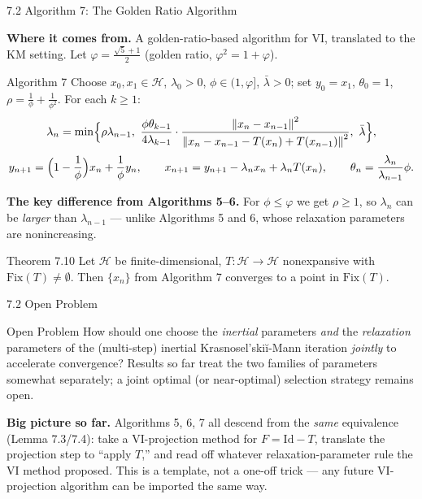 \documentclass[aspectratio=169,10pt]{beamer}
\newcommand{\mHH}{\mathcal H}
\newcommand{\norm}[1]{\left\|#1\right\|}
\newcommand{\Fix}{\mathrm{Fix}}
\newcommand{\Id}{\mathrm{Id}}
\begin{document}
\begin{frame}{7.2 Algorithm 7: The Golden Ratio Algorithm}

  \textbf{Where it comes from.} A golden-ratio-based algorithm for
  VI, translated to the KM setting. Let $\varphi=\tfrac{\sqrt5+1}{2}$
  (golden ratio, $\varphi^2=1+\varphi$).

  \begin{block}{Algorithm 7}
    Choose $x_0,x_1\in\mHH$, $\lambda_0>0$, $\phi\in(1,\varphi]$,
    $\bar\lambda>0$; set $y_0=x_1$, $\theta_0=1$,
    $\rho=\tfrac1\phi+\tfrac1{\phi^2}$. For each $k\ge1$:
    \[
      \lambda_n=\min\Bigl\{\rho\lambda_{n-1},\
        \frac{\phi\theta_{k-1}}{4\lambda_{k-1}}\cdot
        \frac{\norm{x_n-x_{n-1}}^2}{\norm{x_n-x_{n-1}-T(x_n)+T(x_{n-1})}^2},\
        \bar\lambda\Bigr\},
    \]
    \[
      y_{n+1}=\Bigl(1-\frac1\phi\Bigr)x_n+\frac1\phi y_n, \qquad
      x_{n+1}=y_{n+1}-\lambda_n x_n+\lambda_n T(x_n), \qquad
      \theta_n=\frac{\lambda_n}{\lambda_{n-1}}\phi.
    \]
  \end{block}

  \textbf{The key difference from Algorithms 5--6.} For $\phi\le\varphi$
  we get $\rho\ge1$, so $\lambda_n$ can be \emph{larger} than
  $\lambda_{n-1}$ --- unlike Algorithms 5 and 6, whose relaxation
  parameters are nonincreasing.

  \begin{alertblock}{Theorem 7.10}
    Let $\mHH$ be finite-dimensional, $T:\mHH\to\mHH$ nonexpansive
    with $\Fix(T)\neq\emptyset$. Then $\{x_n\}$ from Algorithm 7
    converges to a point in $\Fix(T)$.
  \end{alertblock}

\end{frame}

\begin{frame}{7.2 Open Problem}

  \begin{block}{Open Problem}
    How should one choose the \emph{inertial} parameters
    \emph{and} the \emph{relaxation} parameters of the (multi-step)
    inertial Krasnosel'ski\u{i}-Mann iteration \emph{jointly} to
    accelerate convergence? Results so far treat the two families of
    parameters somewhat separately; a joint optimal (or
    near-optimal) selection strategy remains open.
  \end{block}

  \textbf{Big picture so far.} Algorithms 5, 6, 7 all descend from
  the \emph{same} equivalence (Lemma 7.3/7.4): take a VI-projection
  method for $F=\Id-T$, translate the projection step to ``apply
  $T$,'' and read off whatever relaxation-parameter rule the VI
  method proposed. This is a template, not a one-off trick --- any
  future VI-projection algorithm can be imported the same way.

\end{frame}
\end{document}
